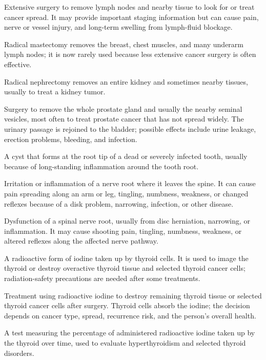  Extensive surgery to remove lymph nodes and nearby tissue to look for or treat cancer spread. It may provide important staging information but can cause pain, nerve or vessel injury, and long-term swelling from lymph-fluid blockage.

 Radical mastectomy removes the breast, chest muscles, and many underarm lymph nodes; it is now rarely used because less extensive cancer surgery is often effective.

 Radical nephrectomy removes an entire kidney and sometimes nearby tissues, usually to treat a kidney tumor.

 Surgery to remove the whole prostate gland and usually the nearby seminal vesicles, most often to treat prostate cancer that has not spread widely. The urinary passage is rejoined to the bladder; possible effects include urine leakage, erection problems, bleeding, and infection.

 A cyst that forms at the root tip of a dead or severely infected tooth, usually because of long-standing inflammation around the tooth root.

 Irritation or inflammation of a nerve root where it leaves the spine. It can cause pain spreading along an arm or leg, tingling, numbness, weakness, or changed reflexes because of a disk problem, narrowing, infection, or other disease.

 Dysfunction of a spinal nerve root, usually from disc herniation, narrowing, or inflammation. It may cause
shooting pain, tingling, numbness, weakness, or altered reflexes along the affected nerve pathway.

 A radioactive form of iodine taken up by thyroid cells. It is used to image the thyroid or destroy overactive thyroid tissue and selected thyroid cancer cells; radiation-safety precautions are needed after some treatments.

 Treatment using radioactive iodine to destroy remaining thyroid tissue or selected thyroid cancer cells after surgery. Thyroid cells absorb the iodine; the decision depends on cancer type, spread, recurrence risk, and the person’s overall health.

 A test measuring the percentage of administered radioactive iodine taken up by the thyroid over time, used to evaluate hyperthyroidism and selected thyroid disorders.

